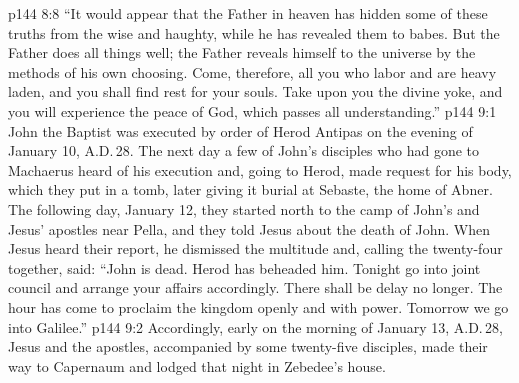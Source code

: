 \vs p144 8:8 \textcolor{ubdarkred}{“It would appear that the Father in heaven has hidden some of these truths from the wise and haughty, while he has revealed them to babes. But the Father does all things well; the Father reveals himself to the universe by the methods of his own choosing. Come, therefore, all you who labor and are heavy laden, and you shall find rest for your souls. Take upon you the divine yoke, and you will experience the peace of God, which passes all understanding.”}
\vs p144 9:1 John the Baptist was executed by order of Herod Antipas on the evening of January 10, A.D.\,28. The next day a few of John’s disciples who had gone to Machaerus heard of his execution and, going to Herod, made request for his body, which they put in a tomb, later giving it burial at Sebaste, the home of Abner. The following day, January 12, they started north to the camp of John’s and Jesus’ apostles near Pella, and they told Jesus about the death of John. When Jesus heard their report, he dismissed the multitude and, calling the twenty\hyp{}four together, said: \textcolor{ubdarkred}{“John is dead. Herod has beheaded him. Tonight go into joint council and arrange your affairs accordingly. There shall be delay no longer. The hour has come to proclaim the kingdom openly and with power. Tomorrow we go into Galilee.”}
\vs p144 9:2 Accordingly, early on the morning of January 13, A.D.\,28, Jesus and the apostles, accompanied by some twenty\hyp{}five disciples, made their way to Capernaum and lodged that night in Zebedee’s house.
